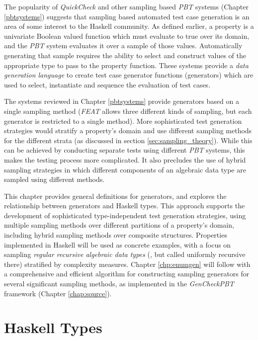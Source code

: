 \documentclass[11pt]{report}
\newcommand{\pbt}{\textit{PBT}\xspace}
\newcommand{\GC}{\textit{GenCheck}\xspace}
\newcommand{\QC}{\textit{QuickCheck}\xspace}
\newcommand{\FEAT}{\textit{FEAT}\xspace}
\begin{document}
The popularity of \QC and other sampling based \pbt systems (Chapter \ref{pbtsystems})
suggests that sampling based automated test case generation
is an area of some interest to the Haskell community.
As defined earlier, 
a property is a univariate Boolean valued function
which must evaluate to true over its domain,
and the \pbt system evaluates it over a sample of those values.
Automatically generating that sample requires the ability to 
select and construct values of the appropriate type
to pass to the property function.
These systems provide a \emph{data generation language} to 
create test case generator functions (generators)
which are used to select, instantiate and sequence the evaluation of test cases.

The systems reviewed in Chapter \ref{pbtsystems}  
provide generators based on a single sampling method
(\FEAT allows three different kinds of sampling, but each generator is restricted to a single method).
More sophisticated test generation strategies
would stratify a property's domain and use different sampling methods for the different strata
(as discussed in section \ref{sec:sampling_theory}).
While this can be achieved by conducting separate tests using different \pbt systems,
this makes the testing process more complicated.
It also precludes the use of hybrid sampling strategies
in which different components of an algebraic data type are 
sampled using different methods.

This chapter provides general definitions for generators,
and explores the relationship between generators and Haskell types.
This approach supports the development of 
sophisticated type-independent test generation strategies,
using multiple sampling methods over different partitions of a property's domain,
including hybrid sampling methods over composite structures.
Properties implemented in Haskell will be used as concrete examples,
with a focus on sampling \emph{regular recursive algebraic data types} 
(\cite{Okasaki1998}, but called uniformly recursive there)
stratified by complexity measures.
Chapter \ref{chp:enumgen} will follow with a comprehensive and efficient algorithm for constructing
sampling generators for several significant sampling methods,
as implemented in the \GC \pbt framework (Chapter \ref{chap:source}).

\section{Haskell Types}\label{algdatatype}

\end{document}

